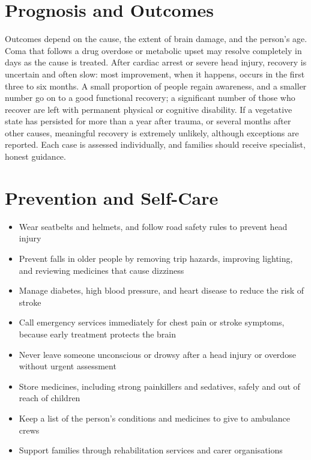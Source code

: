 \section*{Prognosis and Outcomes}
Outcomes depend on the cause, the extent of brain damage, and the person's age. Coma that follows a drug overdose or metabolic upset may resolve completely in days as the cause is treated. After cardiac arrest or severe head injury, recovery is uncertain and often slow: most improvement, when it happens, occurs in the first three to six months. A small proportion of people regain awareness, and a smaller number go on to a good functional recovery; a significant number of those who recover are left with permanent physical or cognitive disability. If a vegetative state has persisted for more than a year after trauma, or several months after other causes, meaningful recovery is extremely unlikely, although exceptions are reported. Each case is assessed individually, and families should receive specialist, honest guidance.

\section*{Prevention and Self-Care}
\begin{itemize}
    \item Wear seatbelts and helmets, and follow road safety rules to prevent head injury
    \item Prevent falls in older people by removing trip hazards, improving lighting, and reviewing medicines that cause dizziness
    \item Manage diabetes, high blood pressure, and heart disease to reduce the risk of stroke
    \item Call emergency services immediately for chest pain or stroke symptoms, because early treatment protects the brain
    \item Never leave someone unconscious or drowsy after a head injury or overdose without urgent assessment
    \item Store medicines, including strong painkillers and sedatives, safely and out of reach of children
    \item Keep a list of the person's conditions and medicines to give to ambulance crews
    \item Support families through rehabilitation services and carer organisations
\end{itemize}
